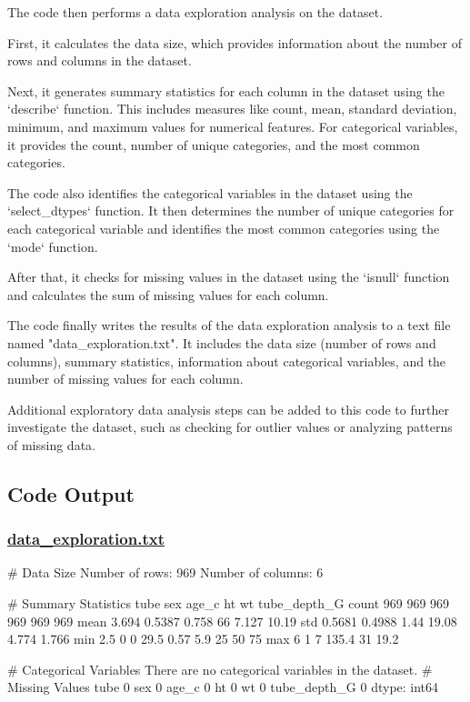 \documentclass[11pt]{article}
\begin{document}
The code then performs a data exploration analysis on the dataset. 

First, it calculates the data size, which provides information about the number of rows and columns in the dataset.

Next, it generates summary statistics for each column in the dataset using the `describe` function. This includes measures like count, mean, standard deviation, minimum, and maximum values for numerical features. For categorical variables, it provides the count, number of unique categories, and the most common categories.

The code also identifies the categorical variables in the dataset using the `select\_dtypes` function. It then determines the number of unique categories for each categorical variable and identifies the most common categories using the `mode` function.

After that, it checks for missing values in the dataset using the `isnull` function and calculates the sum of missing values for each column.

The code finally writes the results of the data exploration analysis to a text file named "data\_exploration.txt". It includes the data size (number of rows and columns), summary statistics, information about categorical variables, and the number of missing values for each column.

Additional exploratory data analysis steps can be added to this code to further investigate the dataset, such as checking for outlier values or analyzing patterns of missing data.

\subsection{Code Output}\hypertarget{file-data-exploration-txt}{}

\subsubsection*{\hyperlink{code-Data Exploration-data-exploration-txt}{data\_exploration.txt}}

\begin{codeoutput}
# Data Size
Number of rows: 969
Number of columns: 6

# Summary Statistics
        tube    sex  age_c    ht    wt  tube_depth_G
count    969    969    969   969   969           969
mean   3.694 0.5387  0.758    66 7.127         10.19
std   0.5681 0.4988   1.44 19.08 4.774         1.766
min      2.5      0      0  29.5  0.57           5.9
25%
50%
75%
max        6      1      7 135.4    31          19.2

# Categorical Variables
There are no categorical variables in the dataset.
# Missing Values
tube            0
sex             0
age_c           0
ht              0
wt              0
tube_depth_G    0
dtype: int64


\end{codeoutput}
\end{document}
